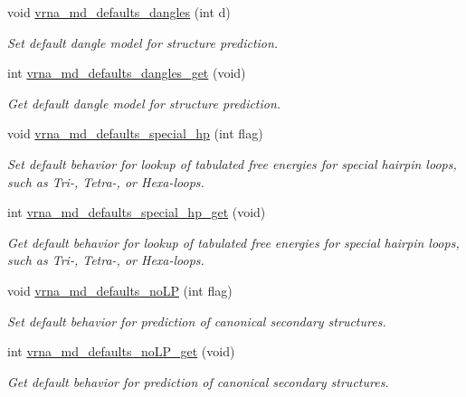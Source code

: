 \begin{DoxyCompactItemize}
void \hyperlink{group__model__details_gac76a5374def8e5e4e644ff6e4cc72dee}{vrna\+\_\+md\+\_\+defaults\+\_\+dangles} (int d)
\begin{DoxyCompactList}\small\item\em Set default dangle model for structure prediction. \end{DoxyCompactList}\item 
int \hyperlink{group__model__details_ga67ca06f95ae133778c79a4493c9817b8}{vrna\+\_\+md\+\_\+defaults\+\_\+dangles\+\_\+get} (void)
\begin{DoxyCompactList}\small\item\em Get default dangle model for structure prediction. \end{DoxyCompactList}\item 
void \hyperlink{group__model__details_gafff6449a02744add0308e653230c15fc}{vrna\+\_\+md\+\_\+defaults\+\_\+special\+\_\+hp} (int flag)
\begin{DoxyCompactList}\small\item\em Set default behavior for lookup of tabulated free energies for special hairpin loops, such as Tri-\/, Tetra-\/, or Hexa-\/loops. \end{DoxyCompactList}\item 
int \hyperlink{group__model__details_ga1d68a6efdaa1253cc63fd9cd06452559}{vrna\+\_\+md\+\_\+defaults\+\_\+special\+\_\+hp\+\_\+get} (void)
\begin{DoxyCompactList}\small\item\em Get default behavior for lookup of tabulated free energies for special hairpin loops, such as Tri-\/, Tetra-\/, or Hexa-\/loops. \end{DoxyCompactList}\item 
void \hyperlink{group__model__details_ga2f88ffc393ac9d7987849c965fd29ea8}{vrna\+\_\+md\+\_\+defaults\+\_\+no\+LP} (int flag)
\begin{DoxyCompactList}\small\item\em Set default behavior for prediction of canonical secondary structures. \end{DoxyCompactList}\item 
int \hyperlink{group__model__details_ga934344888fbacaed538bbbfe910f2aa6}{vrna\+\_\+md\+\_\+defaults\+\_\+no\+L\+P\+\_\+get} (void)
\begin{DoxyCompactList}\small\item\em Get default behavior for prediction of canonical secondary structures. \end{DoxyCompactList}\item 

\end{DoxyCompactItemize}

